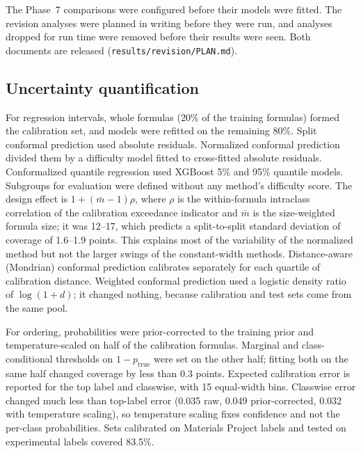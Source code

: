 \documentclass[11pt,a4paper]{article}
\begin{document}
The Phase~7 comparisons were configured before their models were fitted. The revision analyses were planned in writing before they were run, and analyses dropped for run time were removed before their results were seen. Both documents are released (\texttt{results/revision/PLAN.md}).

\subsection*{Uncertainty quantification}
For regression intervals, whole formulas (20\% of the training formulas) formed the calibration set, and models were refitted on the remaining 80\%. Split conformal prediction used absolute residuals. Normalized conformal prediction divided them by a difficulty model fitted to cross-fitted absolute residuals. Conformalized quantile regression used XGBoost 5\% and 95\% quantile models. Subgroups for evaluation were defined without any method's difficulty score. The design effect is $1+(\bar m-1)\rho$, where $\rho$ is the within-formula intraclass correlation of the calibration exceedance indicator and $\bar m$ is the size-weighted formula size; it was 12--17, which predicts a split-to-split standard deviation of coverage of 1.6--1.9 points. This explains most of the variability of the normalized method but not the larger swings of the constant-width methods. Distance-aware (Mondrian) conformal prediction calibrates separately for each quartile of calibration distance. Weighted conformal prediction used a logistic density ratio of $\log(1+d)$\cite{tibshirani2019covariate}; it changed nothing, because calibration and test sets come from the same pool.

For ordering, probabilities were prior-corrected to the training prior\cite{saerens2002adjusting} and temperature-scaled on half of the calibration formulas. Marginal and class-conditional thresholds on $1-p_\mathrm{true}$ were set on the other half\cite{vovk2013conditional}; fitting both on the same half changed coverage by less than 0.3 points. Expected calibration error is reported for the top label and classwise\cite{kull2019dirichlet}, with 15 equal-width bins. Classwise error changed much less than top-label error (0.035 raw, 0.049 prior-corrected, 0.032 with temperature scaling), so temperature scaling fixes confidence and not the per-class probabilities. Sets calibrated on Materials Project labels and tested on experimental labels covered 83.5\%.
\end{document}
